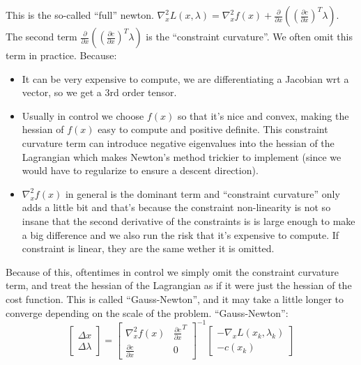 This is the so-called ``full'' newton. $\nabla _{x}^{2} L( x,\lambda ) = \nabla_x^2 f(x) + \frac{\partial}{\partial x}\left(\left(\frac{\partial c}{\partial x}\right)^T\lambda\right)$. The second term $\frac{\partial}{\partial x}\left(\left(\frac{\partial c}{\partial x}\right)^T\lambda\right)$ is the ``constraint curvature''. We often omit this term in practice. Because:
\begin{itemize}
    \item It can be very expensive to compute, we are differentiating a Jacobian wrt a vector, so we get a 3rd order tensor. 
    \item Usually in control we choose $f(x)$ so that it's nice and convex, making the hessian of $f(x)$ easy to compute and positive definite. This constraint curvature term can introduce negative eigenvalues into the hessian of the Lagrangian which makes Newton's method trickier to implement (since we would have to regularize to ensure a descent direction).
    \item $\nabla_x^2 f(x)$ in general is the dominant term and ``constraint curvature'' only adds a little bit and that's because the constraint non-linearity is not so insane that the second derivative of the constraints is is large enough to make a big difference and we also run the risk that it's expensive to compute. If constraint is linear, they are the same wether it is omitted.
\end{itemize}
Because of this, oftentimes in control we simply omit the constraint curvature term, and treat the hessian of the Lagrangian as if it were just the hessian of the cost function. This is called ``Gauss-Newton'', and it may take a little longer to converge depending on the scale of the problem. ``Gauss-Newton'':
\begin{equation}
    \begin{bmatrix}
    \Delta x\\
    \Delta \lambda 
    \end{bmatrix} =\begin{bmatrix}
    \nabla _{x}^{2} f( x ) & \frac{\partial c}{\partial x}^{T}\\
    \frac{\partial c}{\partial x} & 0
    \end{bmatrix}^{-1}\begin{bmatrix}
    -\nabla _{x} L( x_{k} ,\lambda _{k})\\
    -c( x_{k})
    \end{bmatrix}
\end{equation}

